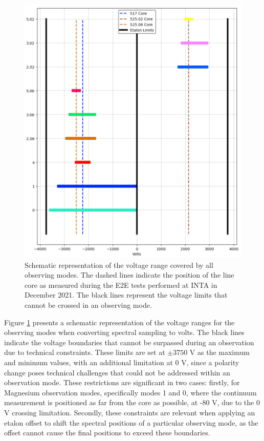\begin{figure}[t]
    \begin{minipage}[c]{0.67\textwidth}
      \includegraphics[width=\textwidth]{figures/Pipeline/obs_modes.pdf}
    \end{minipage}\hfill
    \begin{minipage}[c]{0.29\textwidth}
      \caption{
       Schematic representation of the voltage range covered by all observing modes. The dashed lines indicate the position of the line core as measured during the E2E tests performed at INTA in December 2021. The black lines represent the voltage limits that cannot be crossed in an observing mode.
       \label{fig_pipeline: Observing modes ranges}
      } 
    \end{minipage}
\end{figure}

Figure \ref{fig_pipeline: Observing modes ranges} presents a schematic representation of the voltage ranges for the observing modes when converting spectral sampling to volts. The black lines indicate the voltage boundaries that cannot be surpassed during an observation due to technical constraints. These limits are set at $\pm 3750$ V as the maximum and minimum values, with an additional limitation at 0 V, since a polarity change poses technical challenges that could not be addressed within an observation mode. These restrictions are significant in two cases: firstly, for Magnesium observation modes, specifically modes 1 and 0, where the continuum measurement is positioned as far from the core as possible, at -80 V, due to the 0 V crossing limitation. Secondly, these constraints are relevant when applying an etalon offset to shift the spectral positions of a particular observing mode, as the offset cannot cause the final positions to exceed these boundaries.

